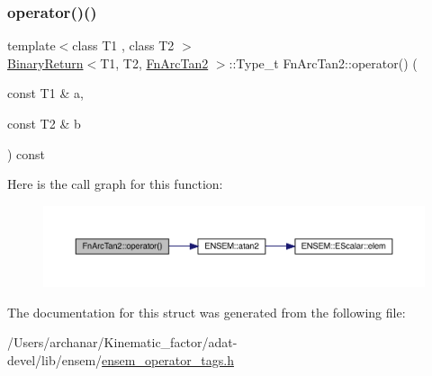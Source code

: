 \subsubsection{\texorpdfstring{operator()()}{operator()()}\hspace{0.1cm}{\footnotesize\ttfamily [3/3]}}
{\footnotesize\ttfamily template$<$class T1 , class T2 $>$ \\
\mbox{\hyperlink{structBinaryReturn}{Binary\+Return}}$<$T1, T2, \mbox{\hyperlink{structFnArcTan2}{Fn\+Arc\+Tan2}} $>$\+::Type\+\_\+t Fn\+Arc\+Tan2\+::operator() (\begin{DoxyParamCaption}\item[{const T1 \&}]{a,  }\item[{const T2 \&}]{b }\end{DoxyParamCaption}) const\hspace{0.3cm}{\ttfamily [inline]}}

Here is the call graph for this function\+:
\nopagebreak
\begin{figure}[H]
\begin{center}
\leavevmode
\includegraphics[width=350pt]{d0/d07/structFnArcTan2_a919de5b0c020758f5280cc89b30e6133_cgraph}
\end{center}
\end{figure}


The documentation for this struct was generated from the following file\+:\begin{DoxyCompactItemize}
\item 
/\+Users/archanar/\+Kinematic\+\_\+factor/adat-\/devel/lib/ensem/\mbox{\hyperlink{adat-devel_2lib_2ensem_2ensem__operator__tags_8h}{ensem\+\_\+operator\+\_\+tags.\+h}}\end{DoxyCompactItemize}

